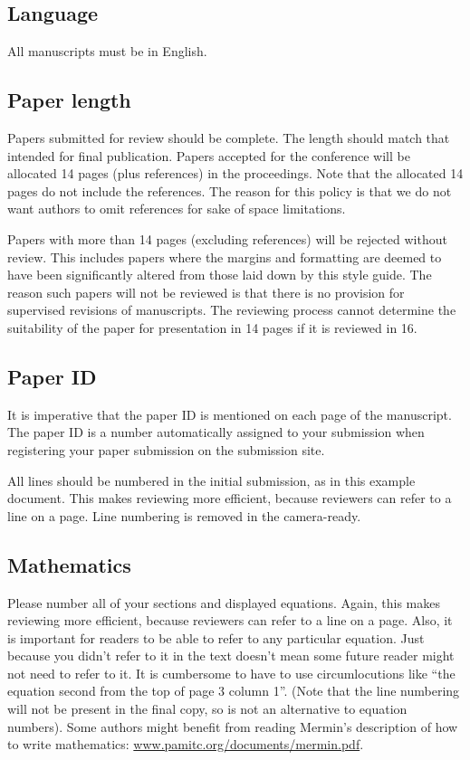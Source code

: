 \documentclass[runningheads]{llncs}
\begin{document}
\subsection{Language}

All manuscripts must be in English.

\subsection{Paper length}
Papers submitted for review should be complete. 
The length should match that intended for final publication. 
Papers accepted for the conference will be allocated 14 pages (plus references) in the proceedings. 
Note that the allocated 14 pages do not include the references. The reason for this policy
is that we do not want authors to omit references for sake of space limitations.

Papers with more than 14 pages (excluding references) will be rejected without review.
This includes papers where the margins and
formatting are deemed to have been significantly altered from those
laid down by this style guide.  The reason such papers will not be reviewed is that there is no provision for supervised revisions of manuscripts. The reviewing process cannot determine the suitability of the paper for presentation in 14 pages if it is reviewed in 16.

\subsection{Paper ID}

It is imperative that the paper ID is mentioned on each page of the manuscript.
The paper ID is a number automatically assigned to your submission when 
registering your paper submission on the submission site.



All lines should be numbered in the initial submission, as in this example document. This makes reviewing more efficient, because reviewers can refer to a line on a page. Line numbering is removed in the camera-ready.


\subsection{Mathematics}

Please number all of your sections and displayed equations.  Again,
this makes reviewing more efficient, because reviewers can refer to a
line on a page.  Also, it is important for readers to be able to refer
to any particular equation.  Just because you didn't refer to it in
the text doesn't mean some future reader might not need to refer to
it.  It is cumbersome to have to use circumlocutions like ``the
equation second from the top of page 3 column 1''.  (Note that the
line numbering will not be present in the final copy, so is not an
alternative to equation numbers).  Some authors might benefit from
reading Mermin's description of how to write mathematics:
\url{www.pamitc.org/documents/mermin.pdf}.
\end{document}
